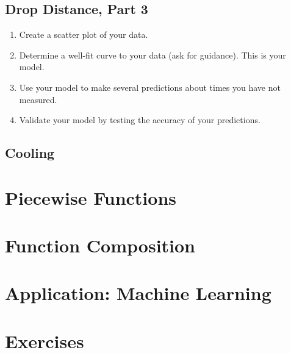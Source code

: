    
\newpage     
    \subsection*{Drop Distance, Part 3}
 \begin{enumerate}
	\item Create a scatter plot of your data. 
	\item Determine a well-fit curve to your data (ask for guidance). This is your model. 
	\item Use your model to make several predictions about times you have not measured.
	\item Validate your model by testing the accuracy of your predictions.  
\end{enumerate}
  
\newpage   
    \subsection{Cooling}
    
\section{Piecewise Functions}    

\section{Function Composition}    

\section{Application: Machine Learning} 

\section{Exercises} 